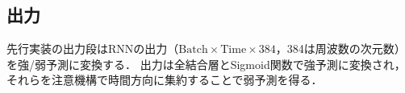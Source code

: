 \documentclass[main]{subfiles}
\begin{document}

\subsection{出力}
先行実装の出力段はRNNの出力（$\text{Batch} \times \text{Time} \times 384$，384は周波数の次元数）を強/弱予測に変換する．
出力は全結合層とSigmoid関数で強予測に変換され，それらを注意機構で時間方向に集約することで弱予測を得る．
\end{document}
